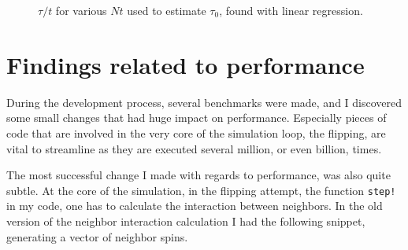 \documentclass[12pt, a4paper]{article}
\begin{document}
\begin{figure}[H]
  \centering
  \caption{$\tau/t$ for various $Nt$ used to estimate $\tau_0$, found with linear regression.
    \label{fig:tau_TN}}
\end{figure}


\section{Findings related to performance\label{sec:performance}}
During the development process, several benchmarks were made, and I discovered some small changes that had huge impact on performance.
Especially pieces of code that are involved in the very core of the simulation loop, the flipping, are vital to streamline as they are executed several million, or even billion, times.

The most successful change I made with regards to performance, was also quite subtle.
At the core of the simulation, in the flipping attempt, the function \verb|step!| in my code, one has to calculate the interaction between neighbors.
In the old version of the neighbor interaction calculation I had the following snippet, generating a vector of neighbor spins.
\end{document}
